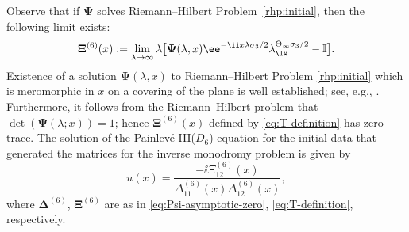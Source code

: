 Observe that if $\mathbf \Psi$ solves Riemann--Hilbert Problem~\ref{rhp:initial}, then the following limit exists:
\begin{equation}
\label{eq:T-definition}
 \mathbf{\Xi}^{(6)}(x):=\lim_{\lambda\to\infty}\lambda\big[\mathbf{\Psi}(\lambda,x)\ee^{-\ii x\lambda\sigma_3/2}\lambda_{\lw}^{\Theta_\infty\sigma_3/2}-\mathbb{I}\big].
\end{equation}
 Existence of a solution $\mathbf{\Psi}(\lambda, x)$ to Riemann--Hilbert Problem \ref{rhp:initial} which is meromorphic in $x$ on a covering of the plane is well established; see, e.g., \cite[Theorem 5.4]{FIKN}. Furthermore, it follows from the Riemann--Hilbert problem that $\det (\mathbf{\Psi}(\lambda; x)) = 1$; hence $\mathbf{\Xi}^{(6)}(x)$ defined by \eqref{eq:T-definition} has zero trace. The solution of the Painlev\'e-III($D_6$) equation for the initial data that generated the matrices for the inverse monodromy problem is given by
 \begin{equation}
 u(x)=\frac{-\ii \Xi^{(6)}_{12}(x)}{{\Delta}^{(6)}_{11}(x){\Delta}^{(6)}_{12}(x)},
 \label{eq:u-recover-general}
 \end{equation}
where $\mathbf{\Delta}^{(6)}$, $\mathbf{\Xi}^{(6)}$ are as in \eqref{eq:Psi-asymptotic-zero}, \eqref{eq:T-definition}, respectively.


